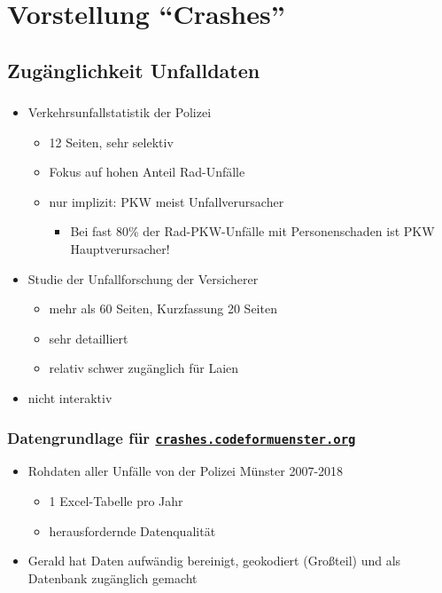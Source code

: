 \documentclass{beamer}
\begin{document}
\section{Vorstellung "`Crashes"'}

\subsection{Zugänglichkeit Unfalldaten}

\begin{frame}
  \frametitle{\subsecname}
  
  \begin{itemize}
    \item Verkehrsunfallstatistik der Polizei \cite{Polizei2019}
    \begin{itemize}
      \item 12 Seiten, sehr selektiv
      \item Fokus auf hohen Anteil Rad-Unfälle
      \item nur implizit: PKW meist Unfallverursacher
      \pause
      \begin{itemize}
        \item Bei fast 80\% der Rad-PKW-Unfälle mit Personenschaden ist PKW Hauptverursacher!
      \end{itemize}
    \end{itemize}
      \pause
    \item Studie der Unfallforschung der Versicherer \cite{Baier2018}
    \begin{itemize}
      \item mehr als 60 Seiten, Kurzfassung 20 Seiten
      \item sehr detailliert
      \item relativ schwer zugänglich für Laien
    \end{itemize}
    \pause
    \item nicht interaktiv
  \end{itemize}
\end{frame}

\begin{frame}
  \frametitle{Datengrundlage für \href{https://crashes.codeformuenster.org}{\texttt{crashes.codeformuenster.org}}}
  
  \begin{itemize}
    \item Rohdaten aller Unfälle von der Polizei Münster 2007-2018
    \begin{itemize}
      \item 1 Excel-Tabelle pro Jahr
      \item herausfordernde Datenqualität
    \end{itemize}
    \pause
    \item Gerald hat Daten aufwändig bereinigt, geokodiert (Großteil) und als Datenbank zugänglich gemacht
  \end{itemize}  
\end{frame}
\end{document}
